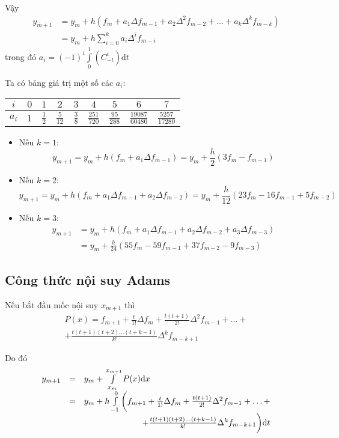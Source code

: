 Vậy
\begin{align*}
	y_{m+1}&=y_m+h\left(f_m+a_1\Delta f_{m-1}+a_2\Delta^2 f_{m-2}+\ldots+a_k\Delta^k f_{m-k}\right)\\
	       &=y_m+h\sum_{i=0}^k a_i\Delta^i f_{m-i}
\end{align*}
trong đó $a_i=(-1)^i\int\limits_{0}^{1}(C_{-t}^i)\mathrm{d}t$

Ta có bảng giá trị một số các $a_i$:
\begin{center}\begin{tabular}{|c|c|c|c|c|c|c|c|c|}\hline
	$i$   & $0$ & $1$       & $2$            & $3$       & $4$               & $5$              & $6$                   & $7$\\\hline
	\tabularrowheight{24pt}
	$a_i$ & $1$ & $\frac12$ & $\frac{5}{12}$ & $\frac38$ & $\frac{251}{720}$ & $\frac{95}{288}$ & $\frac{19087}{60480}$ & $\frac{5257}{17280}$\\\hline
\end{tabular}\end{center}
\begin{itemize}
	\item Nếu $k=1$:
		$$y_{m+1}=y_m+h(f_m+a_1\Delta f_{m-1})=y_m+\frac{h}{2}(3f_m-f_{m-1})$$
	\item Nếu $k=2$:
		$$y_{m+1}=y_m+h(f_m+a_1\Delta f_{m-1}+a_2\Delta f_{m-2})=y_m+\frac{h}{12}(23f_m-16f_{m-1}+5f_{m-2})$$
	\item Nếu $k=3$:
		\begin{align*}
			y_{m+1}&=y_m+h(f_m+a_1\Delta f_{m-1}+a_2\Delta f_{m-2}+a_3\Delta f_{m-3})\\
			&=y_m+\frac{h}{24}(55f_m-59f_{m-1}+37f_{m-2}-9f_{m-3})
		\end{align*}
\end{itemize}

\subsection{Công thức nội suy Adams}

Nếu bắt đầu mốc nội suy $x_{m+1}$ thì
\begin{multline*}
	P(x)=f_{m+1}+\frac{t}{1!}\Delta f_m+\frac{t(t+1)}{2!} \Delta^2 f_{m-1}+\ldots+\\
	+\frac{t(t+1)(t+2)\ldots(t+k-1)}{k!} \Delta^k f_{m-k+1}
\end{multline*}

Do đó
$$\begin{array}{rcl}
	y_{m+1} & = & y_m+\int\limits_{x_m}^{x_{m+1}} P(x)\mathrm{d}x\\
	        & = & y_m+h\int\limits_{-1}^{0}\bigg(f_{m+1}+\frac{t}{1!}\Delta f_m+\frac{t(t+1)}{2!} \Delta^2 f_{m-1}+\ldots+\\
	        &   & \hfill+\frac{t(t+1)(t+2)\ldots(t+k-1)}{k!} \Delta^k f_{m-k+1}\bigg)\mathrm{d}t
\end{array}$$

